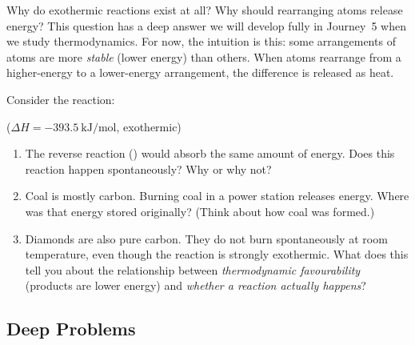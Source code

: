 \documentclass[12pt, a4paper]{book}
\theoremstyle{definition}
\begin{document}
\vspace{0.5em}

Why do exothermic reactions exist at all?
Why should rearranging atoms release energy?
This question has a deep answer we will develop fully in Journey~5
when we study thermodynamics.
For now, the intuition is this:
some arrangements of atoms are more \emph{stable} (lower energy)
than others.
When atoms rearrange from a higher-energy to a lower-energy
arrangement, the difference is released as heat.

\begin{puzzlebox}
Consider the reaction:
\begin{center}
 \quad ($\Delta H = \SI{-393.5}{\kilo\joule\per\mol}$, exothermic)
\end{center}

\begin{enumerate}[label=(\alph*)]
  \item The reverse reaction () would absorb the same
        amount of energy. Does this reaction happen spontaneously?
        Why or why not?
  \item Coal is mostly carbon. Burning coal in a power station
        releases energy. Where was that energy stored originally?
        (Think about how coal was formed.)
  \item Diamonds are also pure carbon. They do not burn spontaneously
        at room temperature, even though the reaction is strongly
        exothermic. What does this tell you about the relationship
        between \emph{thermodynamic favourability} (products are
        lower energy) and \emph{whether a reaction actually happens}?
\end{enumerate}
\end{puzzlebox}

\subsection*{Deep Problems}
\end{document}
